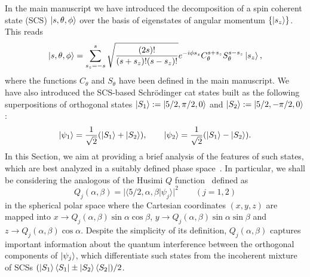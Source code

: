 In the main manuscript we have introduced the decomposition of a spin coherent state (SCS) $\ket{s,\theta,\phi}$ over the basis of eigenstates of angular momentum $\{\ket{s_z}\}$. This reads
\begin{equation}
\ket{s,\theta,\phi}=\sum^s_{s_z=-s}\sqrt{\frac{(2s)!}{(s+s_z)!(s-s_z)!}}e^{-i\phi s_z}C^{s+s_z}_\theta S^{s-s_z}_\theta\ket{s_z},
\end{equation}
where the functions $C_{\theta}$ and $S_\theta$ have been defined in the main manuscript. We have also introduced the SCS-based Schr{\"o}dinger cat states built as the following superpositions of orthogonal states $\ket{S_1}:=\ket{5/2,\pi/2,0}$ and $\ket{S_2}:=\ket{5/2,-\pi/2,0}$:
\begin{equation}
\ket{\psi_{1}}=\frac{1}{\sqrt 2}(\ket{S_1}+\ket{S_2}),\qquad\ket{\psi_{2}}=\frac{1}{\sqrt 2}(\ket{S_1}-\ket{S_2}).
\end{equation}
In this Section, we aim at providing a brief analysis of the features of such states, which are best analyzed in a suitably defined phase space~\cite{agarwal1997atomic}. In particular, we shall be considering the analogous of the Husimi $Q$ function~\cite{WM} defined as
\begin{equation}
\label{deco}
Q_j(\alpha,\beta)=\vert\langle{5/2,\alpha,\beta}\vert\psi_j\rangle\vert^2\qquad(j=1,2)
\end{equation}
in the spherical polar space where the Cartesian coordinates $(x,y,z)$ are mapped into $x\to Q_j(\alpha,\beta)\sin\alpha\cos\beta$, $y\to Q_j(\alpha,\beta)\sin\alpha\sin\beta$ and $z\to Q_j(\alpha,\beta)\cos\alpha$. Despite the simplicity of its definition, $Q_j(\alpha,\beta)$ captures important information about the quantum interference between the orthogonal components of $\ket{\psi_{j}}$, which differentiate such states from the incoherent mixture of SCSs $(\ket{S_1}\bra{S_1}\pm\ket{S_2}\bra{S_2})/2$. 

